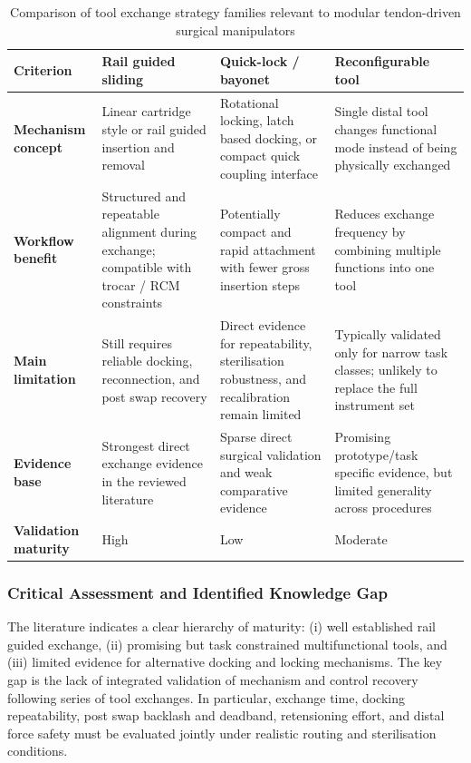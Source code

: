 \documentclass[12pt]{article}
\begin{document}
\begin{table}[H]
\centering
\small
\renewcommand{\arraystretch}{1.25}
\begin{tabular}{|P{3.0cm}|p{4.0cm}|p{4.0cm}|p{4.0cm}|}
\hline
\textbf{Criterion} & \textbf{Rail guided sliding} & \textbf{Quick-lock / bayonet} & \textbf{Reconfigurable tool} \\
\hline
\textbf{Mechanism concept} &
Linear cartridge style or rail guided insertion and removal &
Rotational locking, latch based docking, or compact quick coupling interface &
Single distal tool changes functional mode instead of being physically exchanged \\
\hline
\textbf{Workflow benefit} &
Structured and repeatable alignment during exchange; compatible with trocar / RCM constraints &
Potentially compact and rapid attachment with fewer gross insertion steps &
Reduces exchange frequency by combining multiple functions into one tool \\
\hline
\textbf{Main limitation} &
Still requires reliable docking, reconnection, and post swap recovery &
Direct evidence for repeatability, sterilisation robustness, and recalibration remain limited &
Typically validated only for narrow task classes; unlikely to replace the full instrument set \\
\hline
\textbf{Evidence base} &
Strongest direct exchange evidence in the reviewed literature &
Sparse direct surgical validation and weak comparative evidence &
Promising prototype/task specific evidence, but limited generality across procedures \\
\hline
\textbf{Validation maturity} &
High &
Low &
Moderate \\
\hline
\end{tabular}
\caption[Tool Exchange Comparison]{Comparison of tool exchange strategy families relevant to modular tendon-driven surgical manipulators}
\label{tab:tool_exchange_comparison}
\end{table}

\subsubsection{Critical Assessment and Identified Knowledge Gap}

The literature indicates a clear hierarchy of maturity: (i) well established
rail guided exchange, (ii) promising but task constrained multifunctional tools,
and (iii) limited evidence for alternative docking and locking mechanisms.
The key gap is the lack of integrated validation of mechanism and control
recovery following series of tool exchanges. In particular, exchange time,
docking repeatability, post swap backlash and deadband, retensioning effort,
and distal force safety must be evaluated jointly under realistic routing and
sterilisation conditions.
\end{document}
